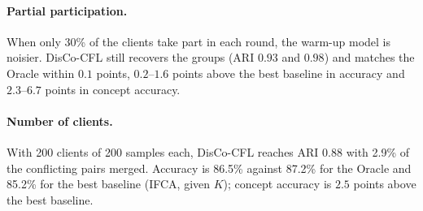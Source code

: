 \paragraph{Partial participation.} When only 30\% of the clients take part in each round, the warm-up model is noisier. DisCo-CFL still recovers the groups (ARI $0.93$ and $0.98$) and matches the Oracle within $0.1$ points, $0.2$--$1.6$ points above the best baseline in accuracy and $2.3$--$6.7$ points in concept accuracy.

\paragraph{Number of clients.} With 200 clients of 200 samples each, DisCo-CFL reaches ARI $0.88$ with 2.9\% of the conflicting pairs merged. Accuracy is 86.5\% against 87.2\% for the Oracle and 85.2\% for the best baseline (IFCA, given $K$); concept accuracy is $2.5$ points above the best baseline.
